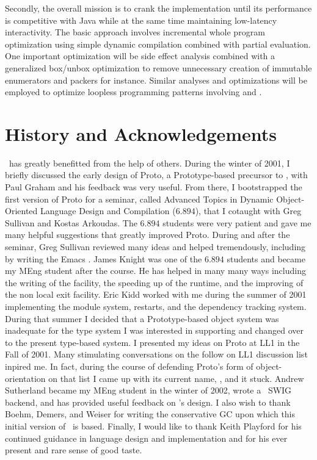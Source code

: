 \documentclass[twoside,twocolumn,9pt]{extarticle}
\begin{document}
Secondly, the overall mission is to crank the implementation until its
performance is competitive with Java while at the same time
maintaining low-latency interactivity.  The basic approach involves
incremental whole program optimization using simple dynamic
compilation combined with partial evaluation.  One important
optimization will be side effect analysis combined with a generalized
box/unbox optimization to remove unnecessary creation of immutable
enumerators and packers for instance.  Similar analyses and
optimizations will be employed to optimize loopless programming
patterns involving  and .

\section{History and Acknowledgements} 

\goo\ has greatly benefitted from the help of others.  During the
winter of 2001, I briefly discussed the early design of Proto, a
Prototype-based precursor to \goo, with Paul Graham and his feedback
was very useful.  From there, I bootstrapped the first version of
Proto for a seminar, called Advanced Topics in Dynamic Object-Oriented
Language Design and Compilation ($6.894$), that I cotaught with Greg
Sullivan and Kostas Arkoudas.  The $6.894$ students were very patient
and gave me many helpful suggestions that greatly improved Proto.
During and after the seminar, Greg Sullivan reviewed many ideas and
helped tremendously, including by writing the Emacs .  
James Knight was one of the $6.894$ students and
became my MEng student after the course.  He has helped in many many
ways including the writing of the  facility, the
speeding up of the runtime, and the improving of the non local exit
facility.  Eric Kidd worked with me during the summer of 2001
implementing the module system, restarts, and the dependency tracking
system.  During that summer I decided that a Prototype-based object
system was inadequate for the type system I was interested in
supporting and changed over to the present type-based system.  I
presented my ideas on Proto at LL1 in the Fall of 2001.  Many
stimulating conversations on the follow on LL1 discussion list inpired
me.  In fact, during the course of defending Proto's form of
object-orientation on that list I came up with its current name, \goo,
and it stuck.  Andrew Sutherland became my MEng student in the winter
of 2002, wrote a \goo\ SWIG~\cite{Beaz96a} backend, and has provided
useful feedback on \goo's design.  I also wish to thank Boehm, Demers,
and Weiser for writing the conservative GC upon which this initial
version of \goo\ is based.  Finally, I would like to thank
Keith Playford for his continued guidance in language design and
implementation and for his ever present and rare sense of good taste.
\end{document}
